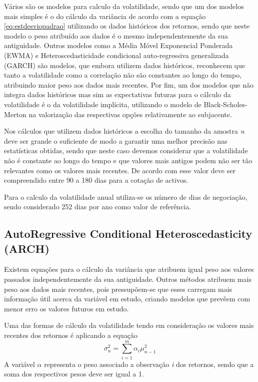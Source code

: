 \documentclass[
  12pt,
  a4paper,
  openany]{book}
\begin{document}
Vários são os modelos para calculo da volatilidade, sendo que um dos modelos mais simples é o do cálculo da variância de acordo com a equação \eqref{eq:estdesviopadrao} utilizando os dados históricos dos retornos, sendo que neste modelo o peso atribuído aos dados é o mesmo independentemente da sua antiguidade. Outros modelos como a Média Móvel Exponencial Ponderada (EWMA) e Heteroscedasticidade condicional auto-regressiva generalizada (GARCH) são modelos, que embora utilizem dados históricos, reconhecem que tanto a volatilidade como a correlação não são constantes ao longo do tempo, atribuindo maior peso aos dados mais recentes. Por fim, um dos modelos que não integra dados históricos mas sim as expectativas futuras para o cálculo da volatilidade é o da volatilidade implícita, utilizando o modelo de Black-Scholes-Merton na valorização das respectivas opções relativamente ao subjacente.

Nos cálculos que utilizem dados históricos a escolha do tamanho da amostra \emph{n} deve ser grande o suficiente de modo a garantir uma melhor precisão nas estatísticas obtidas, sendo que neste caso devemos considerar que a volatilidade não é constante ao longo do tempo e que valores mais antigos podem não ser tão relevantes como os valores mais recentes. De acordo com \citep{Hull2018} esse valor deve ser compreendido entre 90 a 180 dias para a cotação de activos.

Para o calculo da volatilidade anual utiliza-se os número de dias de negociação, sendo considerado 252 dias por ano como valor de referência.

\hypertarget{autoregressive-conditional-heteroscedasticity-arch}{%
\subsection{AutoRegressive Conditional Heteroscedasticity (ARCH)}\label{autoregressive-conditional-heteroscedasticity-arch}}

Existem equações para o cálculo da variância que atribuem igual peso aos valores passados independentemente da sua antiguidade. Outros métodos atribuem mais peso aos dados mais recentes, pois pressupõem-se que esses carregam mais informação útil acerca da variável em estudo, criando modelos que prevêem com menor erro os valores futuros em estudo.

Uma das formas de cálculo da volatilidade tendo em consideração os valores mais recentes dos retornos é aplicando a equação
\begin{equation} 
  \sigma_{n}^{2} =\sum_{i=1}^{m}\alpha_i\mu_{n-1}^{2}
  \label{eq:weight}
\end{equation}
A variável \(\alpha\) representa o peso associado a observação \emph{i} dos retornos, sendo que a soma dos respectivos pesos deve ser igual a 1.
\end{document}
